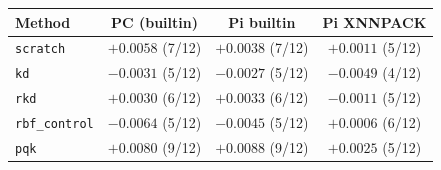 \begin{tabular}{@{}lccc@{}}
\toprule
Method & PC (builtin) & Pi builtin & Pi XNNPACK \\
\midrule
\texttt{scratch} & $+0.0058$ (7/12) & $+0.0038$ (7/12) & $+0.0011$ (5/12) \\
\texttt{kd} & $-0.0031$ (5/12) & $-0.0027$ (5/12) & $-0.0049$ (4/12) \\
\texttt{rkd} & $+0.0030$ (6/12) & $+0.0033$ (6/12) & $-0.0011$ (5/12) \\
\texttt{rbf\_control} & $-0.0064$ (5/12) & $-0.0045$ (5/12) & $+0.0006$ (6/12) \\
\texttt{pqk} & $+0.0080$ (9/12) & $+0.0088$ (9/12) & $+0.0025$ (5/12) \\
\bottomrule
\end{tabular}
